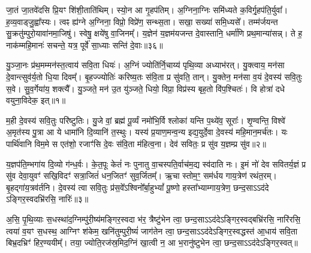 जा॒तं जा॒तवे॑दसि प्रि॒यꣳ शि॑शी॒ताति॑थिम्। स्यो॒न आ गृ॒हप॑तिम्। अ॒ग्निना॒ग्निः समि॑ध्यते क॒विर्गृ॒हप॑ति॒र्युवा᳚। ह॒व्य॒वाड्जु॒ह्वा᳚स्यः। त्वꣴ ह्य॑ग्ने अ॒ग्निना॒ विप्रो॒ विप्रे॑ण॒ सन्थ्स॒ता। सखा॒ सख्या॑ समि॒ध्यसे᳚। तम्म॑र्जयन्त सु॒क्रतु॑म्पुरो॒यावा॑नमा॒जिषु॑। स्वेषु॒ क्षये॑षु वा॒जिनम्᳚। य॒ज्ञेन॑ य॒ज्ञम॑यजन्त दे॒वास्तानि॒ धर्मा॑णि प्रथ॒मान्या॑सन्न्। ते ह॒ नाक॑म्महि॒मानः॑ सचन्ते॒ यत्र॒ पूर्वे॑ सा॒ध्याः सन्ति॑ दे॒वाः॥३६॥


{\anuvakamend[{वोढ॑वे दू॒तस्त्वन्तमु॑ सीद॒त्वा यत्र॑ च॒त्वारि॑ च॥11॥}]}

{}

\setcounter{anuvakam}{0}
यु॒ञ्जा॒नः प्र॑थ॒मम्मन॑स्त॒त्वाय॑ सवि॒ता धियः॑। अ॒ग्निं ज्योति॑र्नि॒चाय्य॑ पृथि॒व्या अध्याभ॑रत्। यु॒क्त्वाय॒ मन॑सा दे॒वान्त्सुव॑र्य॒तो धि॒या दिवम्᳚। बृ॒हज्ज्योतिः॑ करिष्य॒तः स॑वि॒ता प्र सु॑वति॒ तान्। यु॒क्तेन॒ मन॑सा व॒यं दे॒वस्य॑ सवि॒तुः स॒वे। सु॒व॒र्गेया॑य॒ शक्त्यै᳚। यु॒ञ्जते॒ मन॑ उ॒त यु॑ञ्जते॒ धियो॒ विप्रा॒ विप्र॑स्य बृह॒तो वि॑प॒श्चितः॑। वि होत्रा॑ दधे वयुना॒विदेक॒ इत्॥१॥

म॒ही दे॒वस्य॑ सवि॒तुः परि॑ष्टुतिः। यु॒जे वां॒ ब्रह्म॑ पू॒र्व्यं नमो॑भि॒र्वि श्लोका॑ यन्ति प॒थ्ये॑व॒ सूराः᳚। शृ॒ण्वन्ति॒ विश्वे॑ अ॒मृत॑स्य पु॒त्रा आ ये धामा॑नि दि॒व्यानि॑ त॒स्थुः। यस्य॑ प्र॒याण॒मन्व॒न्य इद्य॒युर्दे॒वा दे॒वस्य॑ महि॒मान॒मर्च॑तः। यः पार्थि॑वानि विम॒मे स एत॑शो॒ रजाꣳ॑सि दे॒वः स॑वि॒ता म॑हित्व॒ना। देव॑ सवितः॒ प्र सु॑व य॒ज्ञम्प्र सु॑व॥२॥

य॒ज्ञप॑ति॒म्भगा॑य दि॒व्यो ग॑न्ध॒र्वः। के॒त॒पूः केतं॑ नः पुनातु वा॒चस्पति॒र्वाच॑म॒द्य स्व॑दाति नः। इ॒मं नो॑ देव सवितर्य॒ज्ञं प्र सु॑व देवा॒युवꣳ॑ सखि॒विदꣳ॑ सत्रा॒जितं॑ धन॒जितꣳ॑ सुव॒र्जितम्᳚। ऋ॒चा स्तोम॒ꣳ॒ सम॑र्धय गाय॒त्रेण॑ रथंत॒रम्। बृ॒हद्गा॑य॒त्रव॑र्तनि। दे॒वस्य॑ त्वा सवि॒तुः प्र॑स॒वे᳚\-ऽश्विनो᳚र्बा॒हु\-भ्यां᳚ पू॒ष्णो हस्ता᳚भ्याम्गाय॒त्रेण॒ छन्द॒सा\-ऽ\-ऽद॑दे \-ऽङ्गिर॒स्वदभ्रि॑रसि॒ नारिः॑॥३॥

अ॒सि॒ पृ॒थि॒व्याः स॒धस्था॑द॒ग्निम्पु॑री॒ष्य॑मङ्गिर॒स्वदा भ॑र॒ त्रैष्टु॑भेन त्वा॒ छन्द॒सा\-ऽ\-ऽद॑दे\-ऽङ्गिर॒स्वद्बभ्रि॑रसि॒ नारि॑रसि॒ त्वया॑ व॒यꣳ स॒धस्थ॒ आग्निꣳ श॑केम॒ खनि॑तुम्पुरी॒ष्यं॑ जाग॑तेन त्वा॒ छन्द॒सा\-ऽ\-ऽद॑दे\-ऽङ्गिर॒स्वद्धस्त॑ आ॒धाय॑ सवि॒ता बिभ्र॒दभ्रिꣳ॑ हिर॒ण्ययीम्᳚। तया॒ ज्योति॒रज॑स्र॒मिद॒ग्निं खा॒त्वी न॒ आ भ॒रानु॑ष्टुभेन त्वा॒ छन्द॒सा\-ऽ\-ऽद॑दे\-ऽङ्गिर॒स्वत्॥

